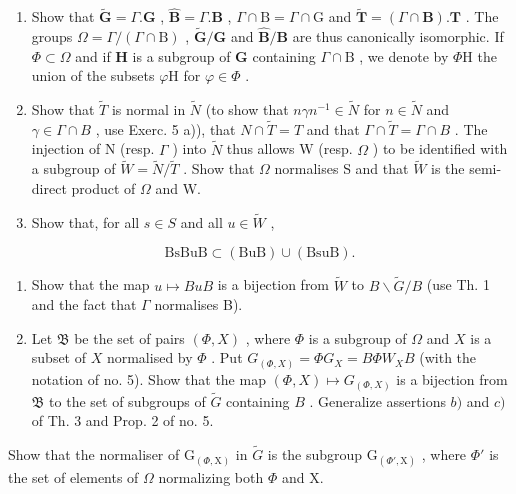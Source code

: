 \begin{enumerate}
\def\labelenumi{\alph{enumi})}
\item
  Show that \(\tilde{\mathbf{G}} = \Gamma .\mathbf{G}\) , \(\hat{\mathbf{B}} = \Gamma .\mathbf{B}\) , \(\Gamma \cap \mathrm{B} = \Gamma \cap \mathrm{G}\) and \(\tilde{\mathbf{T}} = (\Gamma \cap \mathbf{B}).\mathbf{T}\) . The groups \(\Omega = \Gamma /(\Gamma \cap \mathrm{B})\) , \(\tilde{\mathbf{G}} /\mathbf{G}\) and \(\hat{\mathbf{B}} /\mathbf{B}\) are thus canonically isomorphic. If \(\varPhi \subset \varOmega\) and if \(\mathbf{H}\) is a subgroup of \(\mathbf{G}\) containing \(\Gamma \cap \mathrm{B}\) , we denote by \(\varPhi \mathrm{H}\) the union of the subsets \(\varphi \mathrm{H}\) for \(\varphi \in \varPhi\) .
\item
  Show that \(\tilde{T}\) is normal in \(\tilde{N}\) (to show that \(n\gamma n^{-1} \in \tilde{N}\) for \(n \in \tilde{N}\) and \(\gamma \in \Gamma \cap B\) , use Exerc. 5 a)), that \(N \cap \tilde{T} = T\) and that \(\Gamma \cap \tilde{T} = \Gamma \cap B\) . The injection of N (resp. \(\Gamma\) ) into \(\tilde{N}\) thus allows W (resp. \(\Omega\) ) to be identified with a subgroup of \(\tilde{W} = \tilde{N}/\tilde{T}\) . Show that \(\Omega\) normalises S and that \(\tilde{W}\) is the semi-direct product of \(\Omega\) and W.
\item
  Show that, for all \(s \in S\) and all \(u \in \tilde{W}\) ,
\end{enumerate}

\[
\mathrm{BsBuB} \subset (\mathrm{BuB}) \cup (\mathrm{BsuB}).
\]

\begin{enumerate}
\def\labelenumi{\alph{enumi})}
\setcounter{enumi}{3}
\item
  Show that the map \(u \mapsto BuB\) is a bijection from \(\tilde{W}\) to \(B\backslash\tilde{G}/B\) (use Th. 1 and the fact that \(\Gamma\) normalises B).
\item
  Let \(\mathfrak{B}\) be the set of pairs \((\varPhi, X)\) , where \(\varPhi\) is a subgroup of \(\Omega\) and \(X\) is a subset of \(X\) normalised by \(\varPhi\) . Put \(G_{(\varPhi, X)} = \varPhi G_X = B \varPhi W_X B\) (with the notation of no. 5). Show that the map \((\varPhi, X) \mapsto G_{(\varPhi, X)}\) is a bijection from \(\mathfrak{B}\) to the set of subgroups of \(\tilde{G}\) containing \(B\) . Generalize assertions \(b)\) and \(c)\) of Th. 3 and Prop. 2 of no. 5.
\end{enumerate}

Show that the normaliser of \(\mathrm{G}_{(\varPhi,\mathrm{X})}\) in \(\tilde{G}\) is the subgroup \(\mathrm{G}_{(\varPhi',\mathrm{X})}\) , where \(\varPhi'\) is the set of elements of \(\Omega\) normalizing both \(\varPhi\) and X.

